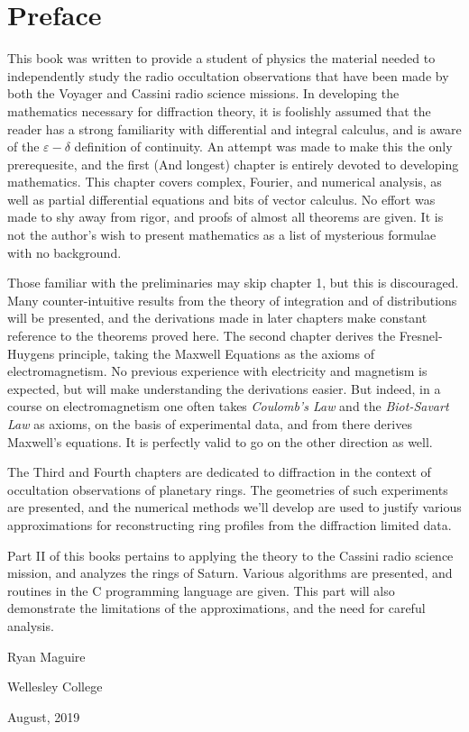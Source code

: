 \chapter*{Preface}
    This book was written to provide a student of physics the material
    needed to independently study the radio occultation observations that
    have been made by both the Voyager and Cassini radio science missions.
    In developing the mathematics necessary for diffraction theory, it is
    foolishly assumed that the reader has a strong
    familiarity with differential and integral calculus, and is aware of the
    $\varepsilon-\delta$ definition of continuity. An attempt was made to
    make this the only prerequesite, and the first (And longest) chapter
    is entirely devoted to developing mathematics. This chapter covers
    complex, Fourier, and numerical analysis, as well as partial
    differential equations and bits of vector calculus. No effort was made
    to shy away from rigor, and proofs of almost all theorems are given.
    It is not the author's wish to present mathematics as a list of
    mysterious formulae with no background.
    \par\hfill\par
    Those familiar with the preliminaries may skip chapter 1, but this is
    discouraged. Many counter-intuitive results from the theory of
    integration and of distributions will be presented, and the
    derivations made in later chapters make constant reference to the
    theorems proved here. The second chapter derives the Fresnel-Huygens
    principle, taking the Maxwell Equations as the axioms of
    electromagnetism. No previous experience with electricity and magnetism
    is expected, but will make understanding the derivations easier.
    But indeed, in a course on electromagnetism one often takes
    \textit{Coulomb's Law} and the \textit{Biot-Savart Law} as axioms,
    on the basis of experimental data, and from there derives Maxwell's
    equations. It is perfectly valid to go on the other direction as well.
    \par\hfill\par
    The Third and Fourth chapters are dedicated to diffraction in the
    context of occultation observations of planetary rings. The geometries
    of such experiments are presented, and the numerical methods we'll
    develop are used to justify various approximations for
    reconstructing ring profiles from the diffraction limited data.
    \par\hfill\par
    Part II of this books pertains to applying the theory to the Cassini
    radio science mission, and analyzes the rings of Saturn. Various
    algorithms are presented, and routines in the C programming language
    are given. This part will also demonstrate the limitations of the
    approximations, and the need for careful analysis.
    \par\hfill\par
    \hfill
    Ryan Maguire
    \par\hfill
    Wellesley College
    \par\hfill
    August, 2019